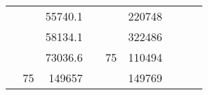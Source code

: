 \begin{table}[H]
\begin{tabular}{|ccrccrccc}
\multicolumn{1}{|c|}{\cellcolor[HTML]{FFFFC7}}                                & \multicolumn{1}{c|}{\cellcolor[HTML]{DAE8FC}}                      & \multicolumn{1}{r|}{\cellcolor[HTML]{DAE8FC}55740.1}   & \multicolumn{1}{c|}{\cellcolor[HTML]{FFFFC7}}                                & \multicolumn{1}{c|}{\cellcolor[HTML]{DAE8FC}}                       & \multicolumn{1}{r|}{\cellcolor[HTML]{DDFDFF}220748}    &                                                                              &                                                                    &                                                        \\ \cline{3-3} \cline{6-6}
\multicolumn{1}{|c|}{\cellcolor[HTML]{FFFFC7}}                                & \multicolumn{1}{c|}{\cellcolor[HTML]{DAE8FC}}                      & \multicolumn{1}{r|}{\cellcolor[HTML]{DDFDFF}58134.1}   & \multicolumn{1}{c|}{\cellcolor[HTML]{FFFFC7}}                                & \multicolumn{1}{c|}{\cellcolor[HTML]{DAE8FC}}                       & \multicolumn{1}{r|}{\cellcolor[HTML]{DAE8FC}322486}    &                                                                              &                                                                    &                                                        \\ \cline{3-3} \cline{6-6}
\multicolumn{1}{|c|}{\cellcolor[HTML]{FFFFC7}}                                & \multicolumn{1}{c|}{\cellcolor[HTML]{DAE8FC}}                      & \multicolumn{1}{r|}{\cellcolor[HTML]{DAE8FC}73036.6}   & \multicolumn{1}{c|}{\cellcolor[HTML]{FFFFC7}}                                & \multicolumn{1}{c|}{\multirow{-10}{*}{\cellcolor[HTML]{DAE8FC}75}}  & \multicolumn{1}{r|}{\cellcolor[HTML]{DDFDFF}110494}    &                                                                              &                                                                    &                                                        \\ \cline{3-3} \cline{5-6}
\multicolumn{1}{|c|}{\cellcolor[HTML]{FFFFC7}}                                & \multicolumn{1}{c|}{\multirow{-10}{*}{\cellcolor[HTML]{DAE8FC}75}} & \multicolumn{1}{r|}{\cellcolor[HTML]{DDFDFF}149657}    & \multicolumn{1}{c|}{\cellcolor[HTML]{FFFFC7}}                                & \multicolumn{1}{c|}{\cellcolor[HTML]{DDFDFF}}                       & \multicolumn{1}{r|}{\cellcolor[HTML]{DAE8FC}149769}    &                                                                              &                                                                    &                                                        \\ \cline{2-3} \cline{6-6}

\end{tabular}
\end{table}
